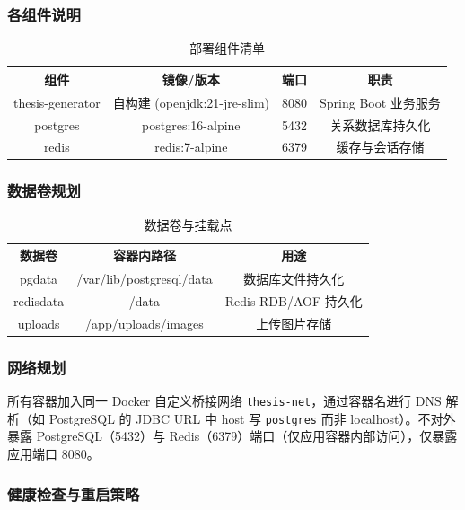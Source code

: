 \subsubsection{各组件说明}

\begin{table}[htbp]
\centering
\caption{部署组件清单}
\label{tab:deploy-components}
\begin{tabular}{|c|c|c|c|}
\hline
\textbf{组件} & \textbf{镜像/版本} & \textbf{端口} & \textbf{职责} \\
\hline
thesis-generator & 自构建 (openjdk:21-jre-slim) & 8080 & Spring Boot 业务服务 \\
\hline
postgres & postgres:16-alpine & 5432 & 关系数据库持久化 \\
\hline
redis & redis:7-alpine & 6379 & 缓存与会话存储 \\
\hline
\end{tabular}
\end{table}

\subsubsection{数据卷规划}

\begin{table}[htbp]
\centering
\caption{数据卷与挂载点}
\label{tab:volumes}
\begin{tabular}{|c|c|c|}
\hline
\textbf{数据卷} & \textbf{容器内路径} & \textbf{用途} \\
\hline
pgdata & /var/lib/postgresql/data & 数据库文件持久化 \\
\hline
redisdata & /data & Redis RDB/AOF 持久化 \\
\hline
uploads & /app/uploads/images & 上传图片存储 \\
\hline
\end{tabular}
\end{table}

\subsubsection{网络规划}

所有容器加入同一 Docker 自定义桥接网络 \texttt{thesis-net}，通过容器名进行 DNS 解析（如 PostgreSQL 的 JDBC URL 中 host 写 \texttt{postgres} 而非 localhost）。不对外暴露 PostgreSQL（5432）与 Redis（6379）端口（仅应用容器内部访问），仅暴露应用端口 8080。

\subsubsection{健康检查与重启策略}

